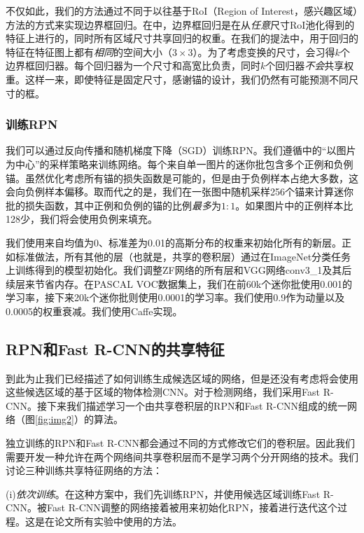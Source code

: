 \documentclass[../main.tex]{subfile}
\begin{document}
不仅如此，我们的方法通过不同于以往基于RoI（Region of Interest，感兴趣区域）方法的方式\cite{spp, fastrcnn}来实现边界框回归。在\cite{spp, fastrcnn}中，边界框回归是在从\textit{任意}尺寸RoI池化得到的特征上进行的，同时所有区域尺寸共享回归的权重。在我们的提法中，用于回归的特征在特征图上都有\textit{相同}的空间大小（$3\times 3$）。为了考虑变换的尺寸，会习得$k$个边界框回归器。每个回归器为一个尺寸和高宽比负责，同时$k$个回归器\textit{不会}共享权重。这样一来，即使特征是固定尺寸，感谢锚的设计，我们仍然有可能预测不同尺寸的框。

\subsubsection{训练RPN} \label{sec:training_RPNs}

我们可以通过反向传播和随机梯度下降（SGD）训练RPN。我们遵循\cite{fastrcnn}中的“以图片为中心”的采样策略来训练网络。每个来自单一图片的迷你批包含多个正例和负例锚。虽然优化考虑所有锚的损失函数是可能的，但是由于负例样本占绝大多数，这会向负例样本偏移。取而代之的是，我们在一张图中随机采样256个锚来计算迷你批的损失函数，其中正例和负例的锚的比例\textit{最多}为$1:1$。如果图片中的正例样本比128少，我们将会使用负例来填充。

我们使用来自均值为0、标准差为0.01的高斯分布的权重来初始化所有的新层。正如标准做法\cite{rcnn}，所有其他的层（也就是，共享的卷积层）通过在ImageNet分类任务上训练得到的模型初始化。我们调整ZF网络的所有层和VGG网络conv3\_1及其后续层来节省内存\cite{fastrcnn}。在PASCAL VOC数据集上，我们在前60k个迷你批使用0.001的学习率，接下来20k个迷你批则使用0.0001的学习率。我们使用0.9作为动量以及0.0005的权重衰减\cite{alexnet}。我们使用Caffe实现。

\subsection{RPN和Fast R-CNN的共享特征} \label{sec:3.2}

到此为止我们已经描述了如何训练生成候选区域的网络，但是还没有考虑将会使用这些候选区域的基于区域的物体检测CNN。对于检测网络，我们采用Fast R-CNN\cite{fastrcnn}。接下来我们描述学习一个由共享卷积层的RPN和Fast R-CNN组成的统一网络（图\ref{fig:img2}）的算法。

独立训练的RPN和Fast R-CNN都会通过不同的方式修改它们的卷积层。因此我们需要开发一种允许在两个网络间共享卷积层而不是学习两个分开网络的技术。我们讨论三种训练共享特征网络的方法：

(i)\textit{依次训练}。在这种方案中，我们先训练RPN，并使用候选区域训练Fast R-CNN。被Fast R-CNN调整的网络接着被用来初始化RPN，接着进行迭代这个过程。这是在论文所有实验中使用的方法。
\end{document}
